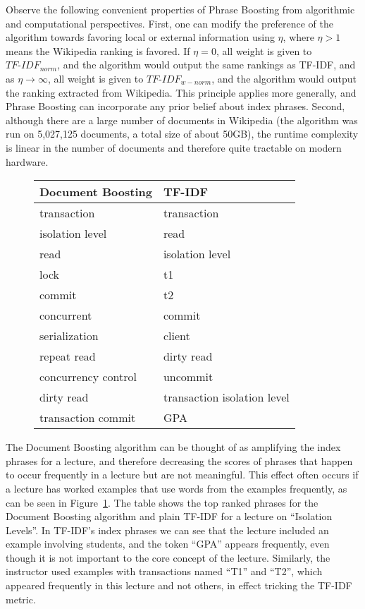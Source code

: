 Observe the following convenient properties of Phrase Boosting from
algorithmic and computational perspectives. First, one can modify the
preference of the algorithm towards favoring local or external
information using $\eta$, where $\eta > 1$ means the Wikipedia ranking
is favored. If $\eta = 0$, all weight is given to $TF\text{-}IDF_{norm}$,
and the algorithm would output the same rankings as TF-IDF, and as
$\eta \to \infty$, all weight is given to $TF\text{-}IDF_{w-norm}$, and
the algorithm would output the ranking extracted from Wikipedia. This
principle applies more generally, and Phrase Boosting can incorporate
any prior belief about index phrases. Second, although there are a large number of documents in Wikipedia (the algorithm was run on 5,027,125 documents, a total size of about 50GB), the runtime complexity is linear in the number of documents and therefore quite tractable on modern hardware.


\begin{figure}[h!]
\caption{}
\label{fig:document_boosting_v_tfidf}
\begin{tabular}{|l|l|}
\hline
\textbf{Document Boosting} & \textbf{TF-IDF} \\
\hline
transaction & transaction \\
\hline
isolation level & read \\
\hline
read & isolation level \\
\hline
lock & t1 \\
\hline
commit & t2 \\
\hline
concurrent & commit \\
\hline
serialization & client \\
\hline
repeat read & dirty read \\
\hline
concurrency control & uncommit \\
\hline
dirty read & transaction isolation level \\
\hline
transaction commit & GPA \\
\hline
\end{tabular}
\end{figure}

The Document Boosting algorithm can be thought of as amplifying the
index phrases for a lecture, and therefore decreasing the scores of
phrases that happen to occur frequently in a lecture but are not
meaningful. This effect often occurs if a lecture has worked examples
that use words from the examples frequently, as can be seen in
Figure~\ref{fig:document_boosting_v_tfidf}. The table shows the top
ranked phrases for the Document Boosting algorithm and plain TF-IDF
for a lecture on ``Isolation Levels''. In TF-IDF's index phrases we
can see that the lecture included an example involving students, and
the token ``GPA'' appears frequently, even though it is not important
to the core concept of the lecture. Similarly, the instructor used
examples with transactions named ``T1'' and ``T2'', which appeared
frequently in this lecture and not others, in effect tricking the
TF-IDF metric.

